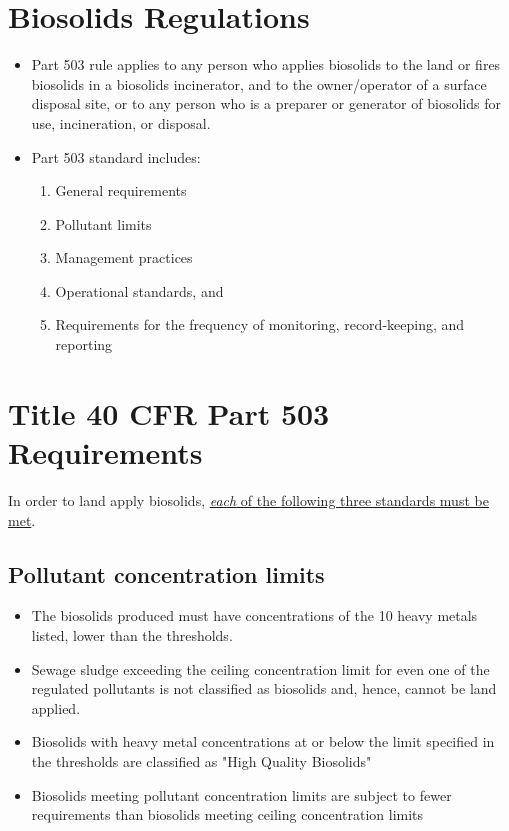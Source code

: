 \section{Biosolids Regulations}

			\begin{itemize}
				\item Part 503 rule applies to any person who applies biosolids to the land or fires biosolids in a biosolids incinerator, and to the owner/operator of a surface disposal site, or to any person who is a preparer or generator of biosolids for use, incineration, or disposal.
				\item Part 503 standard includes:
					\begin{enumerate}
						\item General requirements
						\item Pollutant limits
						\item Management practices
						\item Operational standards, and
						\item Requirements for the frequency of monitoring, record-keeping, and reporting
					\end{enumerate}
			\end{itemize}



\section{Title 40 CFR Part 503 Requirements}

In order to land apply biosolids, \underline{\emph{each} of the following three standards must be met}.

\subsection{Pollutant concentration limits}


			\begin{itemize}
				\item The biosolids produced must have concentrations of the 10 heavy metals listed, lower than the  thresholds.
				\item Sewage sludge exceeding the ceiling concentration limit for even one of the regulated pollutants is not classified as biosolids and, hence, cannot be land applied.
				\item Biosolids with heavy metal concentrations at or below the limit specified in the  thresholds are classified as "High Quality Biosolids"
				\item Biosolids meeting pollutant concentration limits are subject to fewer requirements than biosolids meeting ceiling concentration limits
			\end{itemize}

